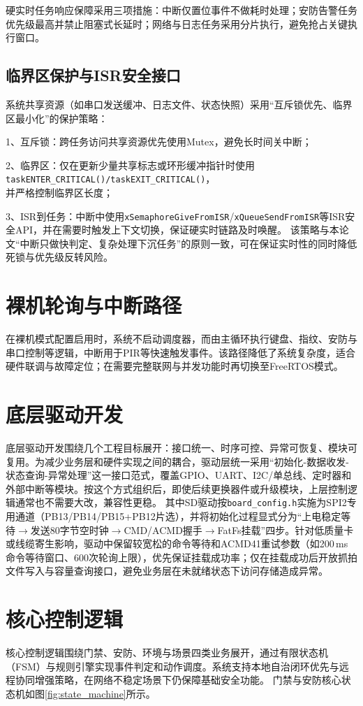 \documentclass[UTF8,12pt,a4paper,oneside]{ctexbook}
\newcommand{\kuan}[1]{\par\noindent\CJKfamily{song}\zihao{-4}#1、}
\numberwithin{equation}{chapter}
\begin{document}
硬实时任务响应保障采用三项措施：中断仅置位事件不做耗时处理；安防告警任务优先级最高并禁止阻塞式长延时；网络与日志任务采用分片执行，避免抢占关键执行窗口。

\subsection{临界区保护与ISR安全接口}
系统共享资源（如串口发送缓冲、日志文件、状态快照）采用“互斥锁优先、临界区最小化”的保护策略：  
\kuan{1}互斥锁：跨任务访问共享资源优先使用Mutex，避免长时间关中断；  
\kuan{2}临界区：仅在更新少量共享标志或环形缓冲指针时使用\texttt{taskENTER\_CRITICAL()/taskEXIT\_CRITICAL()}，\\并严格控制临界区长度；  
\kuan{3}ISR到任务：中断中使用\texttt{xSemaphoreGiveFromISR}/\texttt{xQueueSendFromISR}等ISR安全API，并在需要时触发上下文切换，保证硬实时链路及时唤醒。  
该策略与本论文“中断只做快判定、复杂处理下沉任务”的原则一致，可在保证实时性的同时降低死锁与优先级反转风险。
\section{裸机轮询与中断路径}
在裸机模式配置启用时，系统不启动调度器，而由主循环执行键盘、指纹、安防与串口控制等逻辑，中断用于PIR等快速触发事件。该路径降低了系统复杂度，适合硬件联调与故障定位；在需要完整联网与并发功能时再切换至FreeRTOS模式。
\section{底层驱动开发}
底层驱动开发围绕几个工程目标展开：接口统一、时序可控、异常可恢复、模块可复用。为减少业务层和硬件实现之间的耦合，驱动层统一采用“初始化-数据收发-状态查询-异常处理”这一接口范式，覆盖GPIO、UART、I2C/单总线、定时器和外部中断等模块。按这个方式组织后，即使后续更换器件或升级模块，上层控制逻辑通常也不需要大改，兼容性更稳。
其中SD驱动按\texttt{board\_config.h}实施为SPI2专用通道（PB13/PB14/PB15+PB12片选），并将初始化过程显式分为“上电稳定等待$\rightarrow$发送80字节空时钟$\rightarrow$CMD/ACMD握手$\rightarrow$FatFs挂载”四步。针对低质量卡或线缆寄生影响，驱动中保留较宽松的命令等待和ACMD41重试参数（如200\,ms命令等待窗口、600次轮询上限），优先保证挂载成功率；仅在挂载成功后开放抓拍文件写入与容量查询接口，避免业务层在未就绪状态下访问存储造成异常。
\section{核心控制逻辑}
核心控制逻辑围绕门禁、安防、环境与场景四类业务展开，通过有限状态机（FSM）与规则引擎实现事件判定和动作调度。系统支持本地自治闭环优先与远程协同增强策略，在网络不稳定场景下仍保障基础安全功能。
门禁与安防核心状态机如图\ref{fig:state_machine}所示。
\end{document}
